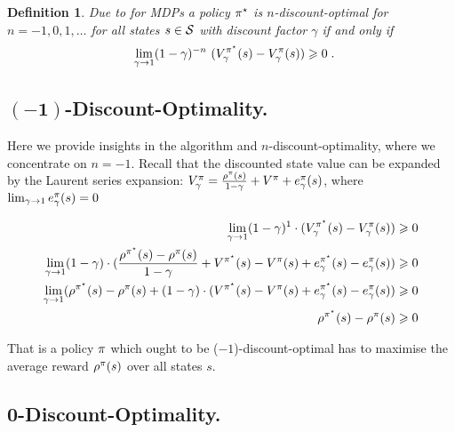 \documentclass[envcountsame]{llncs}
\newtheorem*{definition*}{Definition}
\begin{document}
\begin{definition*}
  Due to \cite{Veinott69} for MDPs a policy \(\pi^{\star}\) is \emph{\(n\)-discount-optimal} for
  \(n=-1,0,1,\ldots\) for all states \(s \in \mathcal{S}\) with discount factor
  \(\gamma\) %
  if and only if
  \begin{align*}
    \lim_{\gamma \to 1}(1-\gamma)^{-n}\ (V_{\gamma}^{\polopt}(s) - V_{\gamma}^{\pol}(s)) \geqslant 0 \tpkt
  \end{align*}
\end{definition*}


\subsection{\(\mathbf{(-1)}\)-Discount-Optimality\cite{Mahadevan96_AnAveragerewardReinforcementLearningAlgorithmForComputingBiasoptimalPolicies}.}

Here we provide insights in the algorithm and
\(n\)-discount-optimality, where we concentrate on \(n=-1\). Recall that the discounted state value
can be expanded by the Laurent series expansion:
\(V_{\gamma}^{\pi} = \frac{\rho^{\pi}(s)}{1-\gamma} + V^{\pi} + e_{\gamma}^{\pi}(s)\), where
\(\lim_{\gamma \to 1} e_{\gamma}^{\pi}(s) = 0\)


\begin{align*}
  \lim_{\gamma \to 1} (1-\gamma)^{1} \cdot (V_{\gamma}^{\pi^{\star}}(s) - V_{\gamma}^{\pi}(s)) \geqslant 0\\
  \lim_{\gamma \to 1} (1-\gamma) \cdot (\frac{\rho^{\pi^{\star}}(s) - \rho^{\pi}(s)}{1-\gamma} + V^{\pi^{\star}}(s) - V^{\pi}(s) + e_{\gamma}^{\pi^{\star}}(s) - e_{\gamma}^{\pi}(s)) \geqslant 0\\
  \lim_{\gamma \to 1} (\rho^{\pi^{\star}}(s) - \rho^{\pi}(s) + (1-\gamma) \cdot (V^{\pi^{\star}}(s) - V^{\pi}(s) + e_{\gamma}^{\pi^{\star}}(s) - e_{\gamma}^{\pi}(s)) \geqslant 0\\
  \rho^{\pi^{\star}}(s) - \rho^{\pi}(s) \geqslant 0\\
\end{align*}

That is a policy \(\pi\) which ought to be (\(-1\))-discount-optimal has to maximise the average reward
\(\rho^{\pi}(s)\) over all states \(s\).

\subsection{\(\mathbf{0}\)-Discount-Optimality\cite{Mahadevan96_AnAveragerewardReinforcementLearningAlgorithmForComputingBiasoptimalPolicies}.}
\end{document}
